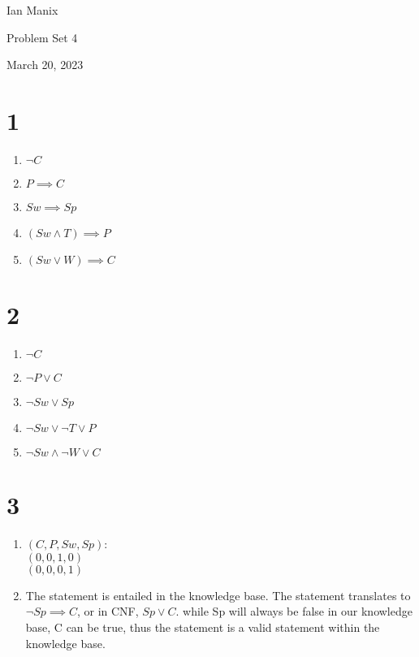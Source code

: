 \documentclass{article}
\begin{document}
    \begin{FlushLeft}
        Ian Manix

        Problem Set 4

        March 20, 2023
    \end{FlushLeft}


    \section*{1}

    \begin{enumerate}
      
        \item $\neg{C}$
        \item $P \implies C$
        \item $Sw \implies Sp$ 
        \item $(Sw \land T) \implies P$
        \item $(Sw \lor W) \implies C$
      
    \end{enumerate}

    \section*{2}

    \begin{enumerate}
      
        \item $\neg{C}$
        \item $\neg{P} \lor C$
        \item $\neg{Sw} \lor Sp$ 
        \item $\neg{Sw} \lor \neg{T} \lor P$
        \item $\neg{Sw} \land \neg{W} \lor C$
      
    \end{enumerate}

    \section*{3}

    \begin{enumerate}

        \item $(C, P, Sw, Sp)$: \\
            $(0, 0, 1, 0)$ \\
            $(0, 0, 0, 1)$

        \item The statement is entailed in the knowledge base. The statement translates to $\neg{Sp} \implies C$, or in CNF, $Sp \lor C$. while Sp will always be false in our knowledge base, C can be true, thus the statement is a valid statement within the knowledge base.
    \end{enumerate}
\end{document}
